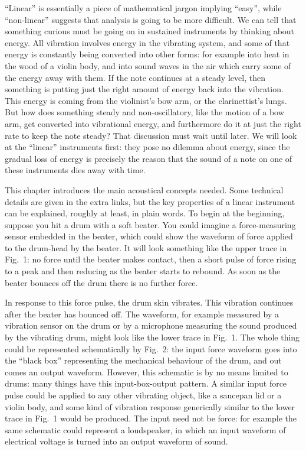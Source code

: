   ``Linear'' is essentially a piece of mathematical jargon implying ``easy'', 
  while ``non-linear'' suggests that analysis is going to be more difficult. We 
  can tell that something curious must be going on in sustained instruments by 
  thinking about energy. All vibration involves energy in the vibrating system, 
  and some of that energy is constantly being converted into other forms: for 
  example into heat in the wood of a violin body, and into sound waves in the 
  air which carry some of the energy away with them. If the note continues at a 
  steady level, then something is putting just the right amount of energy back 
  into the vibration. This energy is coming from the violinist's bow arm, or 
  the clarinettist's lungs. But how does something steady and non-oscillatory, 
  like the motion of a bow arm, get converted into vibrational energy, and 
  furthermore do it at just the right rate to keep the note steady? That 
  discussion must wait until later. We will look at the ``linear'' instruments 
  first: they pose no dilemma about energy, since the gradual loss of energy is 
  precisely the reason that the sound of a note on one of these instruments 
  dies away with time. 

  This chapter introduces the main acoustical concepts needed. Some technical 
  details are given in the extra links, but the key properties of a linear 
  instrument can be explained, roughly at least, in plain words. To begin at 
  the beginning, suppose you hit a drum with a soft beater. You could imagine a 
  force-measuring sensor embedded in the beater, which could show the waveform 
  of force applied to the drum-head by the beater. It will look something like 
  the upper trace in Fig.\ 1: no force until the beater makes contact, then a 
  short pulse of force rising to a peak and then reducing as the beater starts 
  to rebound. As soon as the beater bounces off the drum there is no further 
  force. 

  In response to this force pulse, the drum skin vibrates. This vibration 
  continues after the beater has bounced off. The waveform, for example 
  measured by a vibration sensor on the drum or by a microphone measuring the 
  sound produced by the vibrating drum, might look like the lower trace in 
  Fig.\ 1. The whole thing could be represented schematically by Fig.\ 2: the 
  input force waveform goes into the ``black box'' representing the mechanical 
  behaviour of the drum, and out comes an output waveform. However, this 
  schematic is by no means limited to drums: many things have this 
  input-box-output pattern. A similar input force pulse could be applied to any 
  other vibrating object, like a saucepan lid or a violin body, and some kind 
  of vibration response generically similar to the lower trace in Fig.\ 1 would 
  be produced. The input need not be force: for example the same schematic 
  could represent a loudspeaker, in which an input waveform of electrical 
  voltage is turned into an output waveform of sound. 


